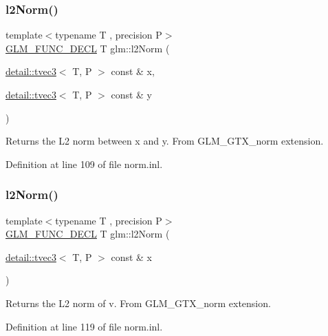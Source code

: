 \subsubsection{\texorpdfstring{l2\+Norm()}{l2Norm()}\hspace{0.1cm}{\footnotesize\ttfamily [1/2]}}
{\footnotesize\ttfamily template$<$typename T , precision P$>$ \\
\hyperlink{setup_8hpp_ab2d052de21a70539923e9bcbf6e83a51}{G\+L\+M\+\_\+\+F\+U\+N\+C\+\_\+\+D\+E\+CL} T glm\+::l2\+Norm (\begin{DoxyParamCaption}\item[{\hyperlink{structglm_1_1detail_1_1tvec3}{detail\+::tvec3}$<$ T, P $>$ const \&}]{x,  }\item[{\hyperlink{structglm_1_1detail_1_1tvec3}{detail\+::tvec3}$<$ T, P $>$ const \&}]{y }\end{DoxyParamCaption})}

Returns the L2 norm between x and y. From G\+L\+M\+\_\+\+G\+T\+X\+\_\+norm extension. 

Definition at line 109 of file norm.\+inl.

\mbox{\label{group__gtx__norm_gacdfd8d645b91db95a191a1294226571b}} 
\subsubsection{\texorpdfstring{l2\+Norm()}{l2Norm()}\hspace{0.1cm}{\footnotesize\ttfamily [2/2]}}
{\footnotesize\ttfamily template$<$typename T , precision P$>$ \\
\hyperlink{setup_8hpp_ab2d052de21a70539923e9bcbf6e83a51}{G\+L\+M\+\_\+\+F\+U\+N\+C\+\_\+\+D\+E\+CL} T glm\+::l2\+Norm (\begin{DoxyParamCaption}\item[{\hyperlink{structglm_1_1detail_1_1tvec3}{detail\+::tvec3}$<$ T, P $>$ const \&}]{x }\end{DoxyParamCaption})}

Returns the L2 norm of v. From G\+L\+M\+\_\+\+G\+T\+X\+\_\+norm extension. 

Definition at line 119 of file norm.\+inl.

\mbox{\label{group__gtx__norm_ga08c670024cd230e22f8b853f185ff533}} 
